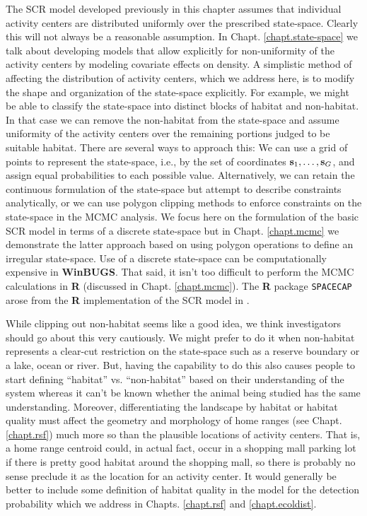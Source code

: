 The SCR model developed previously in this chapter assumes that
individual activity centers are distributed uniformly over the
prescribed state-space. Clearly this will not always be a reasonable
assumption. In Chapt. \ref{chapt.state-space} we talk about developing
models that allow explicitly for non-uniformity of the activity
centers by modeling covariate effects on density. A simplistic method
of
affecting the distribution of activity centers, which we address here,
is to modify the shape and organization of the state-space
explicitly. For example, we might be able to classify the state-space
into distinct blocks of habitat and non-habitat. In that case we can
remove the non-habitat from the state-space and assume uniformity of
the activity centers over the remaining portions judged to be suitable
habitat.  There are several ways to approach this: We can use a
 grid of points to represent the state-space, i.e., by the set
of coordinates ${\bf s}_1, \ldots, {\bf s}_{G}$, and assign equal
probabilities to each possible value. Alternatively, we can retain the
continuous formulation of the state-space but attempt to describe
constraints analytically, or we can use polygon clipping methods to
enforce constraints on the state-space in the MCMC analysis. We focus
here on the formulation of the basic SCR model in terms of a discrete
state-space but in Chapt. \ref{chapt.mcmc}
we demonstrate the latter approach based on using polygon
operations to define an irregular state-space.
Use of a discrete state-space can be computationally expensive in {\bf
  WinBUGS}. That said, it isn't too difficult to perform the MCMC
calculations in {\bf R} (discussed in Chapt.
\ref{chapt.mcmc}). The {\bf R} package {\tt SPACECAP}
\citep{gopalaswamy_etal:2012mee} arose from the {\bf R} implementation of
the SCR model in \citet{royle_etal:2009ecol}.

While clipping out non-habitat seems like a good idea, we think
investigators should go about this very cautiously.  We might prefer
to do it when non-habitat represents a clear-cut restriction on the
state-space such as a reserve boundary or a lake, ocean or river. But,
having the capability to do this also causes people to start defining
``habitat'' vs. ``non-habitat'' based on their understanding of the
system whereas it can't be known whether the animal being studied has
the same understanding.  Moreover, differentiating the landscape by
habitat or habitat quality must affect the geometry and morphology of
home ranges (see Chapt. \ref{chapt.rsf}) much more so than the
plausible locations of activity centers. That is, a home range
centroid could, in actual fact, occur in a shopping mall parking lot if
there is pretty good habitat around the shopping mall, so there is probably no
sense preclude it as the location for
an activity center.  It would generally be better to include some
definition of habitat quality in the model for the detection
probability \citep{royle_etal:2012ecol} which we address in
Chapts. \ref{chapt.rsf} and \ref{chapt.ecoldist}.


